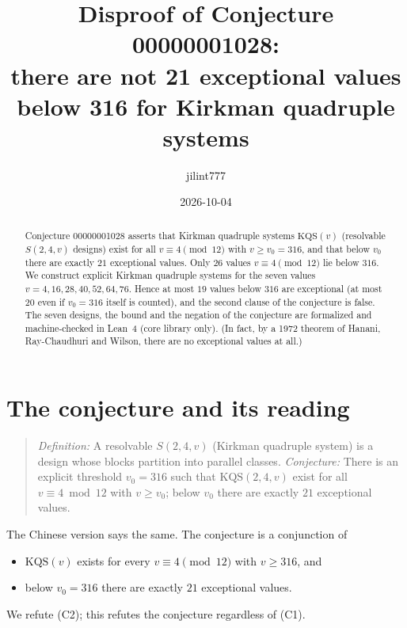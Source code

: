 \documentclass[11pt]{article}
\title{Disproof of Conjecture 00000001028:\\
there are not 21 exceptional values below 316 for Kirkman quadruple systems}
\author{jilint777}
\date{2026-10-04}
\theoremstyle{definition}
\theoremstyle{remark}
\begin{document}
\sloppy
\maketitle

\begin{abstract}
Conjecture 00000001028 asserts that Kirkman quadruple systems $\mathrm{KQS}(v)$
(resolvable $S(2,4,v)$ designs) exist for all $v\equiv4\pmod{12}$ with $v\ge v_0=316$, and
that below $v_0$ there are exactly $21$ exceptional values. Only $26$ values
$v\equiv 4\pmod{12}$ lie below $316$. We construct explicit Kirkman quadruple systems for
the seven values $v=4,16,28,40,52,64,76$. Hence at most $19$ values below $316$ are
exceptional (at most $20$ even if $v_0=316$ itself is counted), and the second clause of the
conjecture is false. The seven designs, the bound and the negation of the conjecture are
formalized and machine-checked in Lean~4 (core library only). (In fact, by a 1972 theorem of
Hanani, Ray-Chaudhuri and Wilson, there are no exceptional values at all.)
\end{abstract}

\section{The conjecture and its reading}
\begin{quote}
\emph{Definition:} A resolvable $S(2,4,v)$ (Kirkman quadruple system) is a design whose
blocks partition into parallel classes. \emph{Conjecture:} There is an explicit threshold
$v_0=316$ such that $\mathrm{KQS}(2,4,v)$ exist for all $v\equiv 4\bmod 12$ with $v\ge v_0$;
below $v_0$ there are exactly $21$ exceptional values.
\end{quote}
The Chinese version says the same. The conjecture is a conjunction of
\begin{itemize}
\item[(C1)] $\mathrm{KQS}(v)$ exists for every $v\equiv4\pmod{12}$ with $v\ge316$, and
\item[(C2)] below $v_0=316$ there are exactly $21$ exceptional values.
\end{itemize}
We refute (C2); this refutes the conjecture regardless of (C1).
\end{document}
